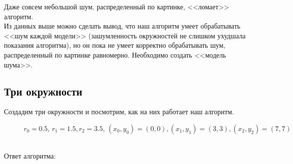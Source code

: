 Даже совсем небольшой шум, распределенный по картинке, <<ломает>> алгоритм.\\
Из данных выше можно сделать вывод, что наш алгоритм умеет обрабатывать <<шум каждой модели>> (зашумленность окружностей не слишком ухудшала показания алгоритма), но он пока не умеет корректно обрабатывать шум, распределенный по картинке равномерно. Необходимо создать <<модель шума>>. \\
\subsection{Три окружности}
Создадим три окружности и посмотрим, как на них работает наш алгоритм. \\
\begin{figure}[h]
\caption{$r_0 = 0.5, \, r_1 = 1.5, r_2 = 3.5, \, (x_0, y_0) = (0, 0), (x_1, y_1) = (3, 3), (x_2, y_2) = (7, 7)$}
\end{figure} \\
Ответ алгоритма: \\
